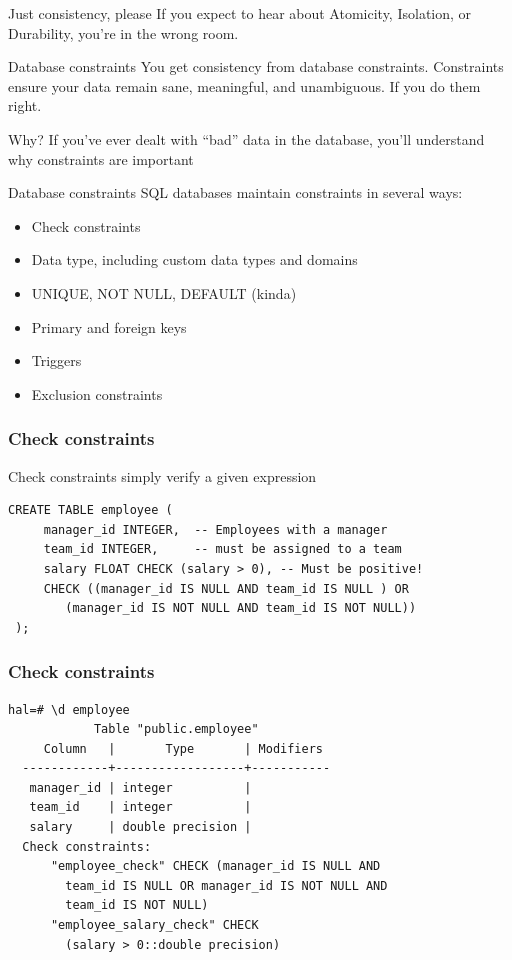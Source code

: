 \documentclass{beamer}
\begin{document}
\begin{frame}{Just consistency, please}
    If you expect to hear about Atomicity, Isolation, or Durability, you're in the wrong room.
\end{frame}

\begin{frame}{Database constraints}
    You get consistency from database constraints. Constraints ensure your data remain sane, meaningful, and unambiguous. If you do them right.
\end{frame}

\begin{frame}
    \begin{block}{Why?}
        If you've ever dealt with ``bad'' data in the database, you'll understand why constraints are important
    \end{block}
\end{frame}

\begin{frame}{Database constraints}
    SQL databases maintain constraints in several ways:
    \begin{itemize}
        \item Check constraints
        \item Data type, including custom data types and domains
        \item UNIQUE, NOT NULL, DEFAULT (kinda)
        \item Primary and foreign keys
        \item Triggers
        \item Exclusion constraints
    \end{itemize}
\end{frame}

\begin{frame}[fragile]
    \frametitle{Check constraints}
    Check constraints simply verify a given expression
\small
    \begin{Verbatim}[fontfamily=courier]
 CREATE TABLE employee (
     manager_id INTEGER,  -- Employees with a manager
     team_id INTEGER,     -- must be assigned to a team
     salary FLOAT CHECK (salary > 0), -- Must be positive!
     CHECK ((manager_id IS NULL AND team_id IS NULL ) OR
        (manager_id IS NOT NULL AND team_id IS NOT NULL))
 );
       \end{Verbatim}
\end{frame}
\begin{frame}[fragile]
    \frametitle{Check constraints}
\small
    \begin{Verbatim}[fontfamily=courier]
  hal=# \d employee
            Table "public.employee"
     Column   |       Type       | Modifiers
  ------------+------------------+-----------
   manager_id | integer          |
   team_id    | integer          |
   salary     | double precision |
  Check constraints:
      "employee_check" CHECK (manager_id IS NULL AND
        team_id IS NULL OR manager_id IS NOT NULL AND
        team_id IS NOT NULL)
      "employee_salary_check" CHECK
        (salary > 0::double precision)
      \end{Verbatim}
\end{frame}
\end{document}
